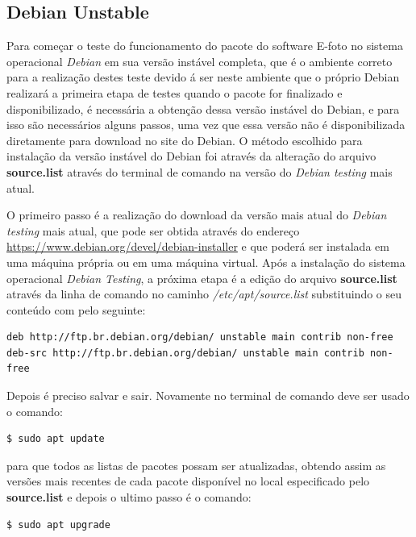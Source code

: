 \subsection{Debian Unstable}

Para começar o teste do funcionamento do pacote do software E-foto no sistema operacional \textit{Debian} em sua versão instável completa, que é o ambiente correto para a realização destes teste devido á ser neste ambiente que o próprio Debian realizará a primeira etapa de testes quando o pacote for finalizado e disponibilizado, é necessária a obtenção dessa versão instável do Debian, e para isso são necessários alguns passos, uma vez que essa versão não é disponibilizada diretamente para download no site do Debian. O método escolhido para instalação da versão instável do Debian foi através da alteração do arquivo \textbf{source.list} através do terminal de comando na versão do \textit{Debian testing} mais atual. 

O primeiro passo é a realização do download da versão mais atual do \textit{Debian testing} mais atual, que pode ser obtida através do endereço \url{https://www.debian.org/devel/debian-installer} e que poderá ser instalada em uma máquina própria ou em uma máquina virtual. Após a instalação do sistema operacional \textit{Debian Testing}, a próxima etapa é a edição do arquivo \textbf{source.list} através da linha de comando no caminho \textit{/etc/apt/source.list} substituindo o seu conteúdo com pelo seguinte:

\begin{verbatim}
deb http://ftp.br.debian.org/debian/ unstable main contrib non-free	
deb-src http://ftp.br.debian.org/debian/ unstable main contrib non-free
\end{verbatim}

Depois é preciso salvar e sair. Novamente no terminal de comando deve ser usado o comando:

\begin{lstlisting}[language=bash]
	$ sudo apt update
\end{lstlisting}

para que todos as listas de pacotes possam ser atualizadas, obtendo assim as versões mais recentes de cada pacote disponível no local especificado pelo \textbf{source.list} e depois o ultimo passo é o comando:

\begin{lstlisting}[language=bash]
	$ sudo apt upgrade
\end{lstlisting}

